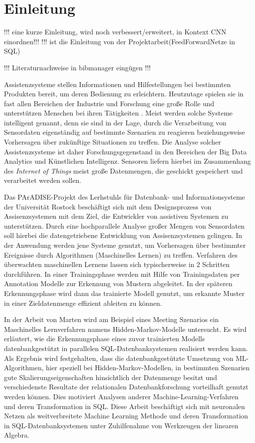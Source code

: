 \chapter{Einleitung}
!!! eine kurze Einleitung, wird noch verbessert/erweitert, in Kontext CNN einordnen!!!
!!! ist die Einleitung von der Projektarbeit(FeedForwardNetze in SQL)

!!! Literaturnachweise in bibmanager eingügen !!!


Assistenzsysteme stellen Informationen und Hilfestellungen bei bestimmten Produkten bereit, um deren Bedienung zu erleichtern. 
Heutzutage spielen sie in fast allen Bereichen der Industrie und Forschung eine große Rolle und unterstützen Menschen bei ihren Tätigkeiten \cite{winner2014handbook, kurihata2005rainy, omerdic2011design}.
Meist werden solche Systeme intelligent genannt, denn sie sind in der Lage, durch die Verarbeitung von Sensordaten eigenständig auf bestimmte Szenarien zu reagieren beziehungsweise Vorhersagen über zukünftige Situationen zu treffen. Die Analyse solcher Assistenzsysteme ist daher Forschungsgegenstand in den Bereichen der Big Data Analytics und Künstlichen Intelligenz.
Sensoren liefern hierbei im Zusammenhang des \textit{Internet of Things} \cite{xia2012internet, wortmann2015internet} meist große Datenmengen, die geschickt gespeichert und verarbeitet werden sollen. 

Das PArADISE-Projekt \cite{paradise} des Lerhstuhls für Datenbank- und Informationsysteme der Universität Rostock beschäftigt sich mit dem Designsprozess von Assisenzsystemen mit dem Ziel, die Entwickler von assistiven Systemen zu unterstützen. Durch eine hochparallele Analyse großer Mengen von Sensordaten soll hierbei die datengetriebene Entwicklung von Assisenzsystemen gelingen. In der Anwendung werden jene Systeme genutzt, um Vorhersagen über bestimmter Ereignisse durch Algorithmen (Maschinelles Lernen) zu treffen. Verfahren des überwachten maschinellen Lernens lassen sich typischerweise in 2 Schritten durchführen. In einer Trainingsphase werden mit Hilfe von Trainingsdaten per Annotation Modelle zur
Erkennung von Mustern abgeleitet. In der späteren Erkennungsphase wird dann das
trainierte Modell genutzt, um erkannte Muster in einer Zieldatenmenge effizient ableiten
zu können. 

In der Arbeit von Marten \cite{marten2017machine} wird am Beispiel eines Meeting Szenarios ein Maschinelles Lernverfahren namens Hidden-Markov-Modelle untersucht. Es wird erläutert, wie die Erkennungsphase eines zuvor trainierten Modells datenbankgestützt in parallelen SQL-Datenbanksystemen realisiert werden kann.   
Als Ergebnis wird festgehalten, dass die datenbankgestützte Umsetzung von ML-Algorithmen, hier speziell bei Hidden-Markov-Modellen, in bestimmten Szenarien gute Skalierungseigenschaften hinsichtlich der Datenmenge besitzt und verschiedenste Resultate der relationalen Datenbankforschung vorteilhaft genutzt werden können. Dies motiviert Analysen anderer Machine-Learning-Verfahren und deren Transformation in SQL. Diese Arbeit beschäftigt sich mit neuronalen Netzen als weitverbreitete Machine Learning Methode und deren Transformation in SQL-Datenbanksystemen unter Zuhilfenahme von Werkzeugen der linearen Algebra.

